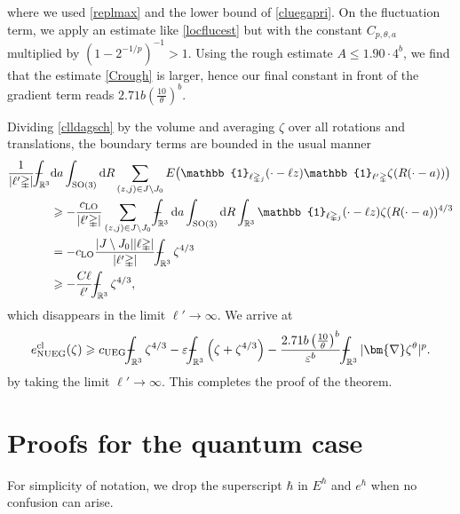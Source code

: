 \documentclass[final,onefignum,onetabnum,reqno]{amsart}
\theoremstyle{remark}
\renewcommand{\le}{\leqslant}
\renewcommand{\ge}{\geqslant}
\renewcommand{\epsilon}{\varepsilon}
\newcommand{\RR}{\mathbb{R}}
\newcommand{\SO}{\mathrm{SO}}
\newcommand{\cl}{\mathrm{cl}} %
\newcommand{\LO}{\mathrm{LO}} %
\newcommand{\UEG}{\mathrm{UEG}} %
\newcommand{\NUEG}{\mathrm{NUEG}} %
\newcommand{\iden}{\mathbb{1}} %
\newcommand{\grad}{\bm{\nabla}} %
\newcommand{\tetra}{\mathbb{\Delta}} %
\newcommand{\dd}{\mathrm{d}} %
\def\Xint#1{\mathchoice
{\XXint\displaystyle\textstyle{#1}}%
{\XXint\textstyle\scriptstyle{#1}}%
{\XXint\scriptstyle\scriptscriptstyle{#1}}%
{\XXint\scriptscriptstyle\scriptscriptstyle{#1}}%
\!\int}
\def\XXint#1#2#3{{\setbox0=\hbox{$#1{#2#3}{\int}$ }
\vcenter{\hbox{$#2#3$ }}\kern-.6\wd0}}
\def\dashint{\Xint-}
\begin{document}
where we used \cref{replmax} and the lower bound of \cref{cluegapri}.
On the fluctuation term, we apply an estimate like \cref{locflucest} but with the constant $C_{p,\theta,a}$ multiplied by $(1-2^{-1/p})^{-1}>1$. Using the rough estimate $A\le 1.90 \cdot 4^b$, we find that the estimate \cref{Crough} is larger, hence our final constant in front of the gradient term reads
$2.71 b \left(\frac{10}{\theta}\right)^b$.

Dividing \cref{clldagsch} by the volume and averaging $\zeta$ over all rotations and translations, the boundary terms are bounded in the usual manner
\begin{align*}
\frac{1}{|\ell'\tetra|}\dashint_{\RR^3}&\dd a\int_{\SO(3)}\dd R\sum_{(z,j)\in J\setminus J_0} E\bigl(\iden_{\ell\tetra_j}(\cdot-\ell z)\iden_{\ell'\tetra}\zeta(R(\cdot-a))\bigr)\\
&\ge - \frac{c_\LO}{|\ell'\tetra|} \sum_{(z,j)\in J\setminus J_0} \dashint_{\RR^3}\dd a\int_{\SO(3)}\dd R\int_{\RR^3} \iden_{\ell\tetra_j}(\cdot-\ell z)\zeta(R(\cdot-a))^{4/3}\\
&= - c_\LO \frac{|J\setminus J_0||\ell\tetra|}{|\ell'\tetra|} \dashint_{\RR^3} \zeta^{4/3}\\
&\ge -\frac{C\ell}{\ell'}\dashint_{\RR^3} \zeta^{4/3},
\end{align*}
which disappears in the limit $\ell'\to\infty$.
We arrive at 
\begin{align*}
e_{\NUEG}^\cl(\zeta)\ge c_\UEG\dashint_{\RR^3} \zeta^{4/3} - \epsilon \dashint_{\RR^3} \left(\zeta+\zeta^{4/3}\right) - \frac{2.71 b \left(\frac{10}{\theta}\right)^b}{\epsilon^{b}} \dashint_{\RR^3} |\grad\zeta^\theta|^p.
\end{align*}
by taking the limit $\ell'\to\infty$.
This completes the proof of the theorem.

\section{Proofs for the quantum case}\label{qproofs}
For simplicity of notation, we drop the superscript $\hbar$ in $E^\hbar$ and $e^\hbar$ when no confusion can arise. 

\end{document}
